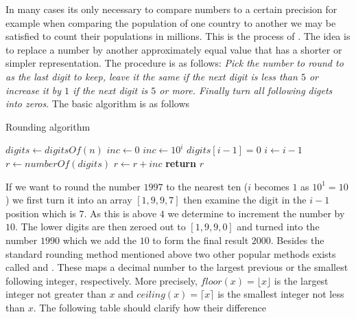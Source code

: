 \myindent In many cases its only necessary to compare numbers to a certain precision for example when comparing the population of one country to another we may be satisfied to count their populations in millions. This is the process of . The idea is to replace a number by another approximately equal value that has a shorter or simpler representation. The procedure is as follows: \textit{Pick the number to round to as the last digit to keep, leave it the same if the next digit is less than $5$ or increase it by $1$ if the next digit is $5$ or more. Finally turn all following digets into zeros}. The basic algorithm is as follows
\begin{algorithm}[H]
    \caption{Rounding algorithm}
    \label{arit:rounding}
    \begin{algorithmic}[1]
         
            \State $digits \gets digitsOf(n)$ 
            \State $inc \gets 0$
                       
                 \State $inc \gets 10^{i}$  
            \EndIf
                                
               \State $digits[i-1] = 0$      
               \State $i \gets i - 1$
            \EndWhile
            \State $r \gets numberOf(digits) $ 
            \State $r \gets r + inc$     
            \State \textbf{return} $r$  
        \EndProcedure
    \end{algorithmic}
\end{algorithm}
If we want to round the number $1997$ to the nearest ten ($i$ becomes $1$ as $10^1 = 10$) we first turn it into an array $\left[1,9,9,7\right]$ then examine the digit in the $i-1$ position which is $7$. As this is above $4$ we determine to increment the number by $10$. The lower digits are then zeroed out to $\left[1,9,9,0\right]$ and turned into the number $1990$ which we add the $10$ to form the final result $2000$. Besides the standard rounding method mentioned above two other popular methods exists called  and . These maps a decimal number to the largest previous or the smallest following integer, respectively. More precisely, $floor(x) = \lfloor x \rfloor$ is the largest integer not greater than $x$ and $ceiling(x) =  \lceil x \rceil$ is the smallest integer not less than $x$. The following table should clarify how their difference

